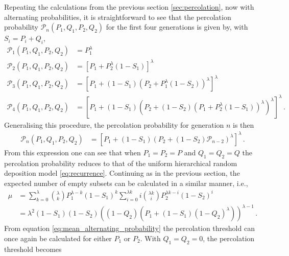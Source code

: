 \documentclass[amsmath,amssymb,amsfonts,aps,pre,preprint,superscriptaddress,bibnotes,showpacs,showkeys,longbibliography,nofootinbib]{revtex4-1}
\begin{document}
Repeating the calculations from the previous section \ref{sec:percolation}, now with alternating probabilities, it is straightforward to see that the percolation probability $\mathcal{P}_n(P_1,Q_1,P_2,Q_2)$ for the first four generations is given by, with $S_i = P_i + Q_i$,
\begin{equation}
    \label{eq:alternating_percolation_examples}
    \begin{split}
        \mathcal{P}_1(P_1,Q_1,P_2,Q_2) &= P_1^\lambda\\
        \mathcal{P}_2(P_1,Q_1,P_2,Q_2) &= \left[P_1 + P_2^\lambda\left(1-S_1\right)\right]^\lambda\\
        \mathcal{P}_3(P_1,Q_1,P_2,Q_2) &= \left[P_1 +\left(1-S_1\right)\left(P_2 + P_1^\lambda(1-S_2)\right)^\lambda\right]^\lambda\\
        \mathcal{P}_4(P_1,Q_1,P_2,Q_2) &= \left[P_1 +\left(1-S_1\right)\left(P_2 + (1-S_2)\left(P_1 + P_2^\lambda (1-S_1)\right)^\lambda\right)^\lambda\right]^\lambda\, .
    \end{split}
\end{equation}
Generalising this procedure, the percolation probability for generation $n$ is then
\begin{equation}
    \label{eq:alternating_percolation_general}
    \begin{split}
        \mathcal{P}_n(P_1,Q_1,P_2,Q_2) &=\left[P_1 + (1-S_1) \left(P_2 +(1-S_2) \mathcal{P}_{n-2}\right)^\lambda\right]^\lambda\, .
    \end{split}
\end{equation}
From this expression one can see that when $P_1=P_2=P$ and $Q_1=Q_2=Q$ the percolation probability reduces to that of the uniform hierarchical random deposition model \eqref{eq:recurrence}. Continuing as in the previous section, the expected number of empty subsets can be calculated in a similar manner, i.e.,
\begin{equation}
    \label{eq:mean_alternating_probability}
    \begin{split}
        \mu &= \sum\limits_{k=0}^\lambda {\lambda \choose k} P_1^{\lambda-k} (1-S_1)^k \sum\limits_{i=0}^{\lambda k} i {\lambda k \choose i} P_2^{\lambda k-i} (1-S_2)^i\\
        &= \lambda^2 (1-S_1)(1-S_2)\left((1-Q_2)\left(P_1 + (1-S_1)(1-Q_2)^\lambda\right)\right)^{\lambda-1}\, .
    \end{split}
\end{equation}
From equation \eqref{eq:mean_alternating_probability} the percolation threshold can once again be calculated for either $P_1$ or $P_2$. With $Q_1 = Q_2 = 0$, the percolation threshold becomes
\end{document}
